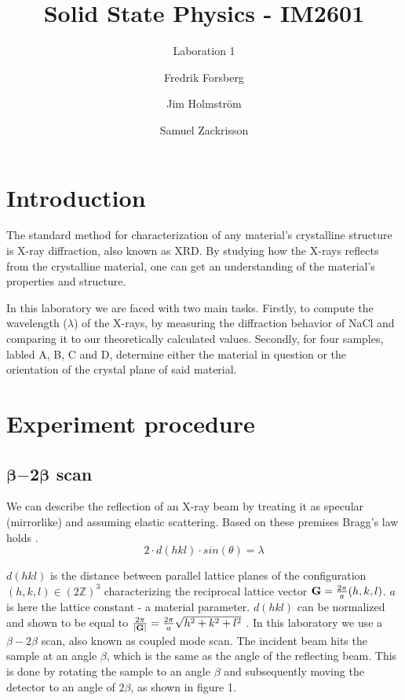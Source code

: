 \documentclass[a4paper,twoside=false,abstract=false,numbers=noenddot,
titlepage=false,headings=small,parskip=half,version=last]{scrartcl}
\title{Solid State Physics - IM2601}
\subtitle{Laboration 1}
\author[1]{Fredrik Forsberg}
\author[1]{Jim Holmström}
\author[1]{Samuel Zackrisson}
\affil[1]{Engineering Physics, Royal Institute of Technology}
\affil[1]{\{fforsber, jimho, samuelz\}@kth.se}
\begin{document}
\maketitle
\thispagestyle{empty}

\section{Introduction}
The standard method for characterization of any material's crystalline structure is X-ray diffraction, also known as XRD.
By studying how the X-rays reflects from the crystalline material, one can get an understanding of the material's properties and structure.

In this laboratory we are faced with two main tasks.
Firstly, to compute the wavelength ($\lambda$) of the X-rays, by measuring the diffraction behavior of NaCl and comparing it to our theoretically calculated values.
Secondly, for four samples, labled A, B, C and D, determine either the material in question or the orientation of the crystal plane of said material.

\section{Experiment procedure}
\subsection{$\boldsymbol{\beta}\boldsymbol{-}\boldsymbol{2}\boldsymbol{\beta}$ scan}
We can describe the reflection of an X-ray beam by treating it as specular (mirrorlike) and assuming elastic scattering. Based on these premises Bragg's law holds \cite{Kittel}.
\begin{equation}
    \label{eq:braggs}
    2 \cdot d(hkl) \cdot sin( \theta ) = \lambda
\end{equation}

$d(hkl)$ is the distance between parallel lattice planes of the configuration $(h,k,l)\in \left(2 \mathbb{Z}\right)^3$
characterizing the reciprocal lattice vector $\bold{G}=\frac{2\pi}{a}(h,k,l)$. $a$ is here the lattice constant - a material parameter.
$d(hkl)$ can be normalized and shown to be equal to $\frac{2\pi}{\left\vert \bold{G} \right\vert} = \frac{2\pi}{a}\sqrt{h^2+k^2+l^2}$ \cite{Kittel}.
In this laboratory we use a $\beta-2\beta$ scan, also known as coupled mode scan.
The incident beam hits the sample at an angle $\beta$, which is the same as the angle of the reflecting beam.
This is done by rotating the sample to an angle $\beta$ and subsequently moving the detector to an angle of $2\beta$, as shown in figure 1.
\end{document}
